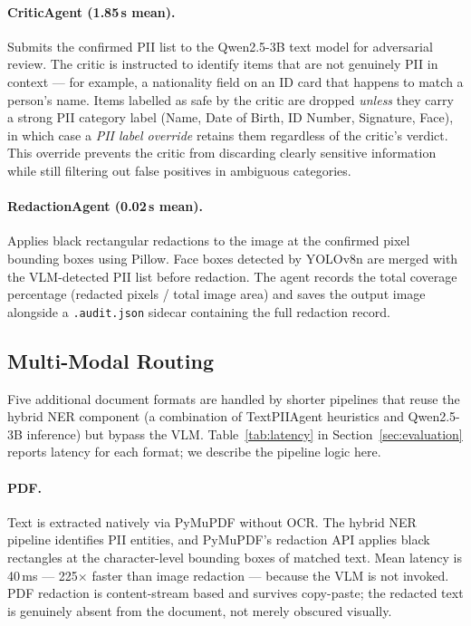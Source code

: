 \documentclass[conference]{IEEEtran}
\begin{document}
\paragraph{CriticAgent (1.85\,s mean).}
Submits the confirmed PII list to the Qwen2.5-3B
text model for adversarial review.
The critic is instructed to identify items that are
not genuinely PII in context --- for example, a
nationality field on an ID card that happens to match
a person's name.
Items labelled as safe by the critic are dropped
\emph{unless} they carry a strong PII category label
(Name, Date of Birth, ID Number, Signature, Face),
in which case a \textit{PII label override} retains
them regardless of the critic's verdict.
This override prevents the critic from discarding
clearly sensitive information while still filtering
out false positives in ambiguous categories.

\paragraph{RedactionAgent (0.02\,s mean).}
Applies black rectangular redactions to the image
at the confirmed pixel bounding boxes using Pillow.
Face boxes detected by YOLOv8n are merged with the
VLM-detected PII list before redaction.
The agent records the total coverage percentage
(redacted pixels / total image area) and saves the
output image alongside a \texttt{.audit.json} sidecar
containing the full redaction record.

\subsection{Multi-Modal Routing}
\label{sec:multimodal}

Five additional document formats are handled by
shorter pipelines that reuse the hybrid NER component
(a combination of TextPIIAgent heuristics and
Qwen2.5-3B inference) but bypass the VLM.
Table~\ref{tab:latency} in Section~\ref{sec:evaluation}
reports latency for each format; we describe the
pipeline logic here.

\paragraph{PDF.}
Text is extracted natively via PyMuPDF without OCR.
The hybrid NER pipeline identifies PII entities,
and PyMuPDF's redaction API applies black rectangles
at the character-level bounding boxes of matched
text.
Mean latency is 40\,ms --- 225$\times$ faster than
image redaction --- because the VLM is not invoked.
PDF redaction is content-stream based and survives
copy-paste; the redacted text is genuinely absent
from the document, not merely obscured visually.
\end{document}
